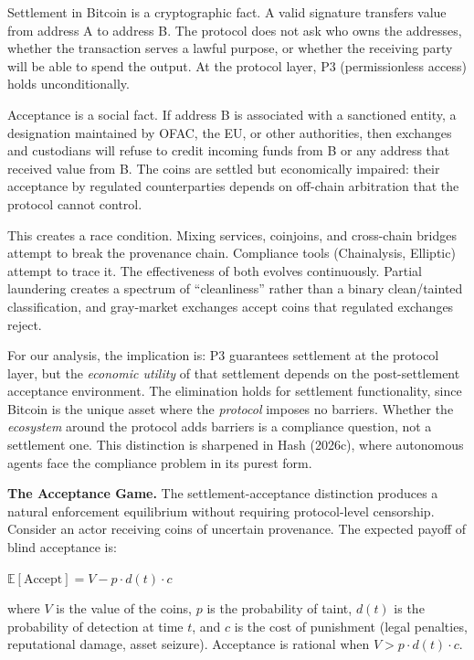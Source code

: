 \documentclass[12pt]{article}
\theoremstyle{definition}
\theoremstyle{remark}
\newcommand{\E}{\mathbb{E}}
\begin{document}
Settlement in Bitcoin is a cryptographic fact. A valid signature
transfers value from address A to address B. The protocol does not ask
who owns the addresses, whether the transaction serves a lawful purpose,
or whether the receiving party will be able to spend the output. At the
protocol layer, P3 (permissionless access) holds unconditionally.

Acceptance is a social fact. If address B is associated with a
sanctioned entity, a designation maintained by OFAC, the EU, or other
authorities, then exchanges and custodians will refuse to credit
incoming funds from B or any address that received value from B. The
coins are settled but economically impaired: their acceptance by
regulated counterparties depends on off-chain arbitration that the
protocol cannot control.

This creates a race condition. Mixing services, coinjoins, and
cross-chain bridges attempt to break the provenance chain. Compliance
tools (Chainalysis, Elliptic) attempt to trace it. The effectiveness of
both evolves continuously. Partial laundering creates a spectrum of
``cleanliness'' rather than a binary clean/tainted classification, and
gray-market exchanges accept coins that regulated exchanges reject.

For our analysis, the implication is: P3 guarantees settlement at the
protocol layer, but the \emph{economic utility} of that settlement
depends on the post-settlement acceptance environment. The elimination
holds for settlement functionality, since Bitcoin is the unique asset
where the \emph{protocol} imposes no barriers. Whether the
\emph{ecosystem} around the protocol adds barriers is a compliance
question, not a settlement one. This distinction is sharpened in Hash
(2026c), where autonomous agents face the compliance problem in its
purest form.

\noindent\textbf{The Acceptance Game.} The settlement-acceptance distinction
produces a natural enforcement equilibrium without requiring
protocol-level censorship. Consider an actor receiving coins of
uncertain provenance. The expected payoff of blind acceptance is:

$\E[\text{Accept}] = V - p \cdot d(t) \cdot c$

where $V$ is the value of the coins, $p$ is the probability of
taint, $d(t)$ is the probability of detection at time $t$, and $c$
is the cost of punishment (legal penalties, reputational damage,
asset seizure). Acceptance is rational when $V > p \cdot d(t) \cdot c$.
\end{document}
